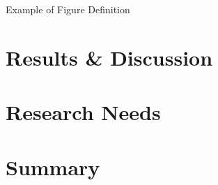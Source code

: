 \documentclass[12pt,oneside]{book}
\begin{document}
Example of Figure Definition



\chapter{Results \& Discussion}



\chapter{Research Needs}


\chapter{Summary}




\clearpage

\appendix
\captionsetup{list=no}
\end{document}
